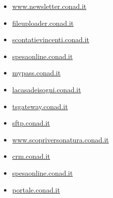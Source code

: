 \documentclass{article}
\begin{document}
\begin{itemize}
        
        
        \item \href{ https://www.newsletter.conad.it/ }{ www.newsletter.conad.it }
    
        
        
        \item \href{ http://fileuploader.conad.it }{ fileuploader.conad.it }
    
        
        
        \item \href{ https://scontatievincenti.conad.it/ }{ scontatievincenti.conad.it }
    
        
        
        \item \href{ https://spesaonline.conad.it/order?bEcommerce=sap\&orderId=o-s-N-23-03667190 }{ spesaonline.conad.it }
    
        
        
        \item \href{ https://mypass.conad.it/mypass/ }{ mypass.conad.it }
    
        
        
        \item \href{ http://lacasadeisogni.conad.it/ }{ lacasadeisogni.conad.it }
    
        
        
        \item \href{ https://tsgateway.conad.it/RDWeb/Pages/en-US/login.aspx?ReturnUrl=/RDWeb/Pages/en-US/Default.aspx }{ tsgateway.conad.it }
    
        
        
        \item \href{ http://sftp.conad.it }{ sftp.conad.it }
    
        
        
        \item \href{ https://www.scopriversonatura.conad.it/ }{ www.scopriversonatura.conad.it }
    
        
        
        \item \href{ http://crm.conad.it }{ crm.conad.it }
    
        
        
        \item \href{ https://spesaonline.conad.it/ }{ spesaonline.conad.it }
    
        
        
        \item \href{ https://portale.conad.it/my.policy }{ portale.conad.it }
    

\end{itemize}
\end{document}
